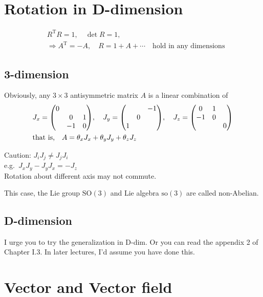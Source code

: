\documentclass[11pt,fleqn]{book} %
\begin{document}
\section{Rotation in D-dimension}
\begin{align*}
  &R^{\mathrm{T}} R = 1,            \quad \det R = 1, \quad \\
  &\Rightarrow A^{\mathrm{T}} = -A, \quad R = 1 + A + \cdots \quad \text{hold in any dimensions}
\end{align*}

\subsection{3-dimension}
Obviously, any \(3 \times 3\) antisymmetric matrix \(A\) is a linear combination
of
\begin{align*}
  &J_x=\mqty(\dmat{0,0&1\\-1&0}), \quad J_y = \mqty(\admat{-1,0,1}), \quad J_z = \mqty(\dmat{0&1\\-1&0,0}) \\
  &\text{that is,}                \quad A = \theta_x J_x + \theta_y J_y + \theta_z J_z
\end{align*}
\begin{emphbox}
  Caution: \(J_i J_j \neq J_j J_i\)      \\
  e.g.\    \(J_x J_y - J_y J_x = - J_z\) \\
  Rotation about different axis may not commute.
\end{emphbox}
This case, the Lie group \(\mathrm{SO}(3)\) and Lie algebra \(\mathrm{so}(3)\) are
called non-Abelian.

\subsection{D-dimension}
\begin{exercise}
  I urge you to try the generalization in D-dim. Or you can read the appendix 2
  of Chapter I.3. In later lectures, I'd assume you have done this.
\end{exercise}

\section{Vector and Vector field}
\end{document}
